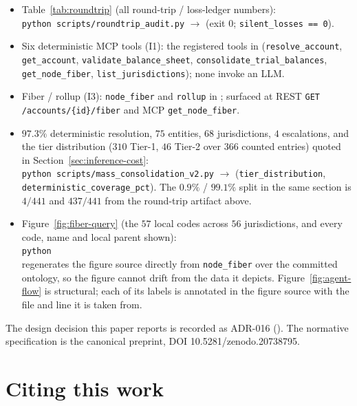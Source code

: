 \documentclass[11pt]{clapps}  %
\begin{document}
\begin{itemize}
  \item Table~\ref{tab:roundtrip} (all round-trip / loss-ledger numbers):\\
  \texttt{python scripts/roundtrip\_audit.py} $\rightarrow$
   (exit 0;
  \texttt{silent\_losses == 0}).
  \item Six deterministic MCP tools (I1): the registered tools in
   (\texttt{resolve\_account}, \texttt{get\_account},
  \texttt{validate\_balance\_sheet}, \texttt{consolidate\_trial\_balances},
  \texttt{get\_node\_fiber}, \texttt{list\_jurisdictions}); none invoke an LLM.
  \item Fiber / rollup (I3): \texttt{node\_fiber} and \texttt{rollup} in
  ; surfaced at REST
  \texttt{GET /accounts/\{id\}/fiber} and MCP \texttt{get\_node\_fiber}.
  \item $97.3\%$ deterministic resolution, $75$ entities, $68$ jurisdictions,
  $4$ escalations, and the tier distribution ($310$ Tier-1, $46$ Tier-2 over
  $366$ counted entries) quoted in Section~\ref{sec:inference-cost}:\\
  \texttt{python scripts/mass\_consolidation\_v2.py} $\rightarrow$
  (\texttt{tier\_distribution}, \texttt{deterministic\_coverage\_pct}).
  The $0.9\%$ / $99.1\%$ split in the same section is
  $4/441$ and $437/441$ from the round-trip artifact above.
  \item Figure~\ref{fig:fiber-query} (the $57$ local codes across $56$
  jurisdictions, and every code, name and local parent shown):\\
  \texttt{python}
  \\
  regenerates the figure source directly from \texttt{node\_fiber} over the
  committed ontology, so the figure cannot drift from the data it depicts.
  Figure~\ref{fig:agent-flow} is structural; each of its labels is annotated
  in the figure source with the file and line it is taken from.
\end{itemize}

The design decision this paper reports is recorded as ADR-016
(). The normative
specification is the canonical preprint, DOI 10.5281/zenodo.20738795.

\section*{Citing this work}
\end{document}

